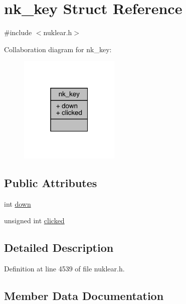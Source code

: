 \hypertarget{structnk__key}{}\section{nk\+\_\+key Struct Reference}
\label{structnk__key}


{\ttfamily \#include $<$nuklear.\+h$>$}



Collaboration diagram for nk\+\_\+key\+:
\nopagebreak
\begin{figure}[H]
\begin{center}
\leavevmode
\includegraphics[width=135pt]{structnk__key__coll__graph}
\end{center}
\end{figure}
\subsection*{Public Attributes}
\begin{DoxyCompactItemize}
\item 
int \mbox{\hyperlink{structnk__key_ad31180f5548bfca7a9998de792ef96b2}{down}}
\item 
unsigned int \mbox{\hyperlink{structnk__key_a55a84cf59c1c5b8cf3e691e690e0c276}{clicked}}
\end{DoxyCompactItemize}


\subsection{Detailed Description}


Definition at line 4539 of file nuklear.\+h.



\subsection{Member Data Documentation}
\mbox{\label{structnk__key_a55a84cf59c1c5b8cf3e691e690e0c276}} 
